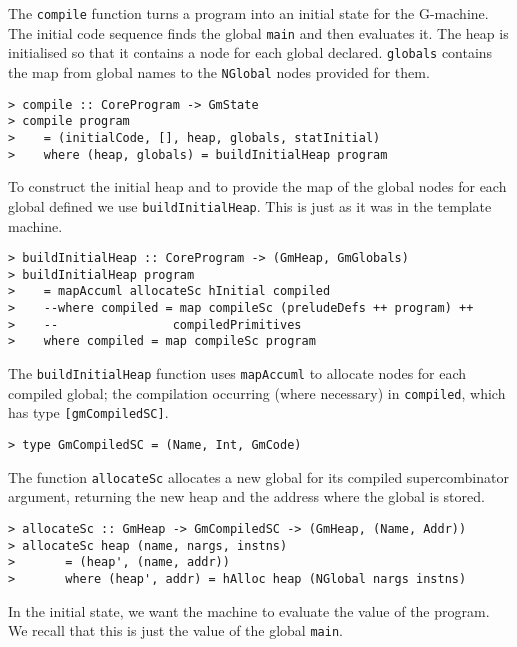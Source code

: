 The \mbox{\tt compile} function turns a program into an initial state for the
G-machine.  The initial code sequence finds the global \mbox{\tt main} and then
evaluates it. The heap is initialised so that it contains a node for
each global declared. \mbox{\tt globals} contains the map from global names to the
\mbox{\tt NGlobal} nodes provided for them.
\begin{verbatim}
> compile :: CoreProgram -> GmState
> compile program
>    = (initialCode, [], heap, globals, statInitial)
>    where (heap, globals) = buildInitialHeap program
\end{verbatim}
%
%
\par
To construct the initial heap and to provide the map of the global
nodes for each global defined we use \mbox{\tt buildInitialHeap}. This is just
as it was in the template machine.
\begin{verbatim}
> buildInitialHeap :: CoreProgram -> (GmHeap, GmGlobals)
> buildInitialHeap program
>    = mapAccuml allocateSc hInitial compiled
>    --where compiled = map compileSc (preludeDefs ++ program) ++
>    --                compiledPrimitives
>    where compiled = map compileSc program
\end{verbatim}
%
%
The \mbox{\tt buildInitialHeap} function uses \mbox{\tt mapAccuml} to allocate nodes for
each compiled global; the compilation occurring (where necessary) in
\mbox{\tt compiled}, which has type \mbox{\tt [gmCompiledSC]}.
\begin{verbatim}
> type GmCompiledSC = (Name, Int, GmCode)
\end{verbatim}
%
The function \mbox{\tt allocateSc} allocates a new global for its compiled
supercombinator argument, returning the new heap and the address where
the global is stored.
\begin{verbatim}
> allocateSc :: GmHeap -> GmCompiledSC -> (GmHeap, (Name, Addr))
> allocateSc heap (name, nargs, instns)
>       = (heap', (name, addr))
>       where (heap', addr) = hAlloc heap (NGlobal nargs instns)
\end{verbatim}
%
%
\par
In the initial state, we want the machine to evaluate the value of the
program. We recall that this is just the value of the global \mbox{\tt main}.
